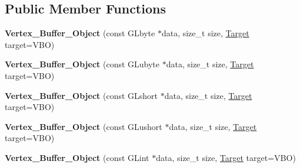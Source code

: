 \subsection*{Public Member Functions}
\begin{DoxyCompactItemize}
\item 
\mbox{\label{classexample_1_1_vertex___buffer___object_aaa001d618b5a390c71f7c4b9f4ce4a2c}} 
{\bfseries Vertex\+\_\+\+Buffer\+\_\+\+Object} (const G\+Lbyte $\ast$data, size\+\_\+t size, \mbox{\hyperlink{classexample_1_1_vertex___buffer___object_a376260819cb29bd5300ce2b9885dedb7}{Target}} target=V\+BO)
\item 
\mbox{\label{classexample_1_1_vertex___buffer___object_a009af70f53c2c6793e75784cae5b6205}} 
{\bfseries Vertex\+\_\+\+Buffer\+\_\+\+Object} (const G\+Lubyte $\ast$data, size\+\_\+t size, \mbox{\hyperlink{classexample_1_1_vertex___buffer___object_a376260819cb29bd5300ce2b9885dedb7}{Target}} target=V\+BO)
\item 
\mbox{\label{classexample_1_1_vertex___buffer___object_a096b7e9e53b62a93261372f5eaecadff}} 
{\bfseries Vertex\+\_\+\+Buffer\+\_\+\+Object} (const G\+Lshort $\ast$data, size\+\_\+t size, \mbox{\hyperlink{classexample_1_1_vertex___buffer___object_a376260819cb29bd5300ce2b9885dedb7}{Target}} target=V\+BO)
\item 
\mbox{\label{classexample_1_1_vertex___buffer___object_a2b22c34ea5204694f380fbd37b6d6c95}} 
{\bfseries Vertex\+\_\+\+Buffer\+\_\+\+Object} (const G\+Lushort $\ast$data, size\+\_\+t size, \mbox{\hyperlink{classexample_1_1_vertex___buffer___object_a376260819cb29bd5300ce2b9885dedb7}{Target}} target=V\+BO)
\item 
\mbox{\label{classexample_1_1_vertex___buffer___object_a5d5aaafa708c5e88954106781f2172bd}} 
{\bfseries Vertex\+\_\+\+Buffer\+\_\+\+Object} (const G\+Lint $\ast$data, size\+\_\+t size, \mbox{\hyperlink{classexample_1_1_vertex___buffer___object_a376260819cb29bd5300ce2b9885dedb7}{Target}} target=V\+BO)
\item 
\mbox{\label{classexample_1_1_vertex___buffer___object_acec815a6a3e1c6c2ad36862141417424}} 

\end{DoxyCompactItemize}
